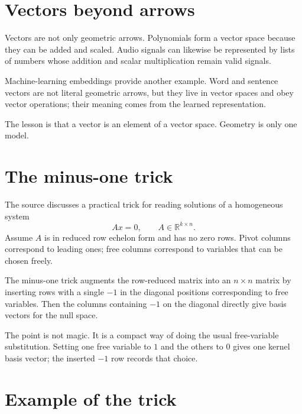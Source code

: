 
\section{Vectors beyond arrows}

Vectors are not only geometric arrows.  Polynomials form a vector space because they can be added and scaled.  Audio signals can likewise be represented by lists of numbers whose addition and scalar multiplication remain valid signals.

Machine-learning embeddings provide another example.  Word and sentence vectors are not literal geometric arrows, but they live in vector spaces and obey vector operations; their meaning comes from the learned representation.

The lesson is that a vector is an element of a vector space.  Geometry is only one model.

\section{The minus-one trick}

The source discusses a practical trick for reading solutions of a homogeneous system
\[
  Ax=0,\qquad A\in\mathbb R^{k\times n}.
\]
Assume $A$ is in reduced row echelon form and has no zero rows.  Pivot columns correspond to leading ones; free columns correspond to variables that can be chosen freely.

The minus-one trick augments the row-reduced matrix into an $n\times n$ matrix by inserting rows with a single $-1$ in the diagonal positions corresponding to free variables.  Then the columns containing $-1$ on the diagonal directly give basis vectors for the null space.

The point is not magic.  It is a compact way of doing the usual free-variable substitution.  Setting one free variable to $1$ and the others to $0$ gives one kernel basis vector; the inserted $-1$ row records that choice.

\section{Example of the trick}

